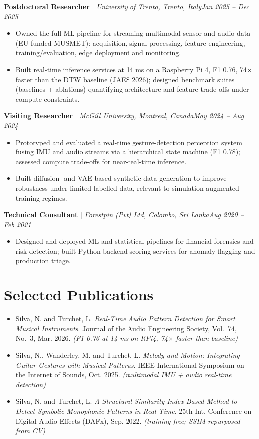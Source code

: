 \documentclass[11pt]{article}
\newenvironment{cvrole}[5]{%
  \par\noindent\textbf{\large #1} | \textit{\small #2, #3}\hfill \textit{\small #4 -- #5}\par
  \begin{itemize}[leftmargin=2em, itemsep=-0.3em, topsep=-0.5em]%
}{%
  \end{itemize}\par\noindent\mbox{}\par\vspace{0.1em}%
}
\begin{document}
\begin{cvrole}{Postdoctoral Researcher}{University of Trento}{Trento, Italy}{Jan 2025}{Dec 2025}
    \item Owned the full ML pipeline for streaming multimodal sensor and audio data (EU-funded MUSMET): acquisition, signal processing, feature engineering, training/evaluation, edge deployment and monitoring.
    \item Built real-time inference services at 14 ms on a Raspberry Pi 4, F1 0.76, 74$\times$ faster than the DTW baseline (JAES 2026); designed benchmark suites (baselines + ablations) quantifying architecture and feature trade-offs under compute constraints.
\end{cvrole}

\begin{cvrole}{Visiting Researcher}{McGill University}{Montreal, Canada}{May 2024}{Aug 2024}
    \item Prototyped and evaluated a real-time gesture-detection perception system fusing IMU and audio streams via a hierarchical state machine (F1 0.78); assessed compute trade-offs for near-real-time inference.
    \item Built diffusion- and VAE-based synthetic data generation to improve robustness under limited labelled data, relevant to simulation-augmented training regimes.
\end{cvrole}

\begin{cvrole}{Technical Consultant}{Forestpin (Pvt) Ltd}{Colombo, Sri Lanka}{Aug 2020}{Feb 2021}
    \item Designed and deployed ML and statistical pipelines for financial forensics and risk detection; built Python backend scoring services for anomaly flagging and production triage.
\end{cvrole}

\section*{Selected Publications \footnotesize {}}
\begin{itemize}[leftmargin=1.2em, itemsep=-0.25em]
    \item Silva, N. and Turchet, L. \textit{Real-Time Audio Pattern Detection for Smart Musical Instruments}. Journal of the Audio Engineering Society, Vol.~74, No.~3, Mar. 2026. \textit{(F1 0.76 at 14 ms on RPi4, 74$\times$ faster than baseline)}
    \item Silva, N., Wanderley, M. and Turchet, L. \textit{Melody and Motion: Integrating Guitar Gestures with Musical Patterns}. IEEE International Symposium on the Internet of Sounds, Oct. 2025. \textit{(multimodal IMU + audio real-time detection)}
    \item Silva, N. and Turchet, L. \textit{A Structural Similarity Index Based Method to Detect Symbolic Monophonic Patterns in Real-Time}. 25th Int. Conference on Digital Audio Effects (DAFx), Sep. 2022. \textit{(training-free; SSIM repurposed from CV)}
\end{itemize}
\end{document}
